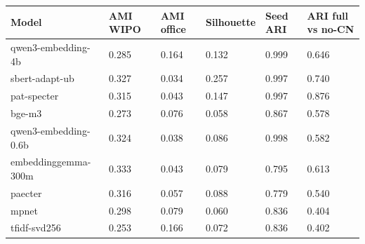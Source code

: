 \begin{tabular}{llllll}
\toprule
Model & AMI WIPO & AMI office & Silhouette & Seed ARI & ARI full vs no-CN \\
\midrule
qwen3-embedding-4b & 0.285 & 0.164 & 0.132 & 0.999 & 0.646 \\
sbert-adapt-ub & 0.327 & 0.034 & 0.257 & 0.997 & 0.740 \\
pat-specter & 0.315 & 0.043 & 0.147 & 0.997 & 0.876 \\
bge-m3 & 0.273 & 0.076 & 0.058 & 0.867 & 0.578 \\
qwen3-embedding-0.6b & 0.324 & 0.038 & 0.086 & 0.998 & 0.582 \\
embeddinggemma-300m & 0.333 & 0.043 & 0.079 & 0.795 & 0.613 \\
paecter & 0.316 & 0.057 & 0.088 & 0.779 & 0.540 \\
mpnet & 0.298 & 0.079 & 0.060 & 0.836 & 0.404 \\
tfidf-svd256 & 0.253 & 0.166 & 0.072 & 0.836 & 0.402 \\
\bottomrule
\end{tabular}
